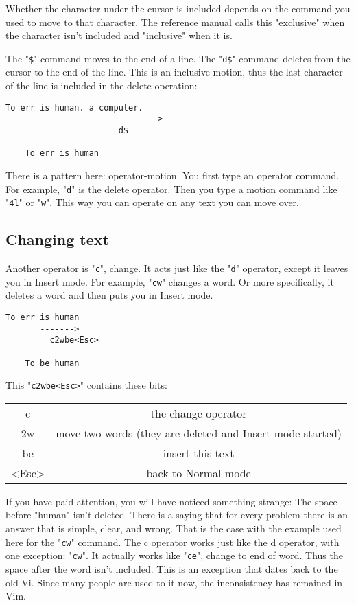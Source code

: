 Whether the character under the cursor is included depends on the command you used to move to that character.
The reference manual calls this "exclusive" when the character isn't included and "inclusive" when it is.

The "\texttt{\$}" command moves to the end of a line.
The "\texttt{d\$}" command deletes from the cursor to the end of the line.
This is an inclusive motion, thus the last character of the line is included in the delete operation:

\begin{Verbatim}[samepage=true]
    To err is human. a computer. 
                   ------------>
                       d$

    To err is human 
\end{Verbatim}

There is a pattern here: operator-motion.
You first type an operator command.
For example, "\texttt{d}" is the delete operator.
Then you type a motion command like "\texttt{4l}" or "\texttt{w}".
This way you can operate on any text you can move over.

\subsection{Changing text}

Another operator is "\texttt{c}", change.
It acts just like the "\texttt{d}" operator, except it leaves you in Insert mode.
For example, "\texttt{cw}" changes a word.
Or more specifically, it deletes a word and then puts you in Insert mode.

\begin{Verbatim}[samepage=true]
    To err is human 
       ------->
         c2wbe<Esc>

    To be human 
\end{Verbatim}

This "\texttt{c2wbe<Esc>}" contains these bits:
\begin{center}
\begin{tabular}{c c}
				c & the change operator\\
				2w & move two words (they are deleted and Insert mode started)\\
				be & insert this text\\
				<Esc> & back to Normal mode\\
\end{tabular}
\end{center}

If you have paid attention, you will have noticed something strange: The space before "human" isn't deleted.
There is a saying that for every problem there is an answer that is simple, clear, and wrong.
That is the case with the example used here for the "\texttt{cw}" command.
The c operator works just like the d operator, with one exception: "\texttt{cw}".
It actually works like "\texttt{ce}", change to end of word.
Thus the space after the word isn't included.
This is an exception that dates back to the old Vi.
Since many people are used to it now, the inconsistency has remained in Vim.

